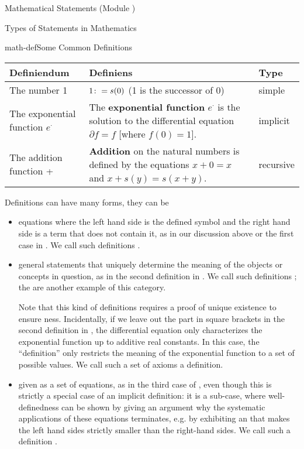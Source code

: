 \begin{tchapter}[id=statements,short=Mathematical Statements]{Mathematical Statements (Module {})}
\begin{tsection}[id=statements-constitutive]{Types of Statements in Mathematics}
\begin{myfig}{math-def}{Some Common Definitions}\small
 \begin{tabular}{|p{2.2cm}|p{7cm}|l|}\hline
   Definiendum & Definiens & Type \\\hline\hline
   The number 1 & $1\colon= s(0)$ (1 is the successor of 0) & simple\\\hline
   The exponential function $e^\cdot$ 
         &  The {\textbf{exponential function}} $e^\cdot$ is the solution to the
   differential equation $\partial f=f$ [where $f(0)=1$]. & implicit\\\hline
   The addition function + & {\textbf{Addition}} on the natural numbers is defined by the equations
   $x+0=x$ and $x+s(y)=s(x+y)$. & recursive\\\hline
 \end{tabular}
\end{myfig}
Definitions can have many forms, they can be
\begin{itemize}
\item equations where the left hand side is the defined symbol and the right hand side is
  a term that does not contain it, as in our discussion above or the first case in
  {}. We call such definitions
  {}.
\item general statements that uniquely determine the meaning of the objects or concepts in
  question, as in the second definition in {}. We call such definitions
  {}; the {} are
  another example of this category.
  
  Note that this kind of definitions requires a proof of unique existence to ensure
  {ness}.  Incidentally, if we leave out the part in square
  brackets in the second definition in {}, the differential equation
  only characterizes the exponential function up to additive real constants. In this case,
  the ``definition'' only restricts the meaning of the exponential function to a set of
  possible values.  We call such a set of axioms a
  {} definition.
\item given as a set of equations, as in the third case of {}, even
  though this is strictly a special case of an implicit definition: it is a sub-case,
  where well-definedness can be shown by giving an argument why the systematic
  applications of these equations terminates, e.g.  by exhibiting an
  {} that makes the left hand sides strictly smaller than the
  right-hand sides. We call such a definition
  {}.
\end{itemize}
\end{tsection}


\end{tchapter}
